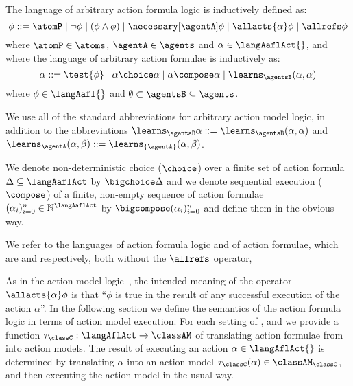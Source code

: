 \documentclass[twoside]{aiml14}
\begin{document}
  \begin{definition}
      The language \langAafl{} of arbitrary action formula logic is inductively defined as:
      $$
          \phi ::= \atomP \mid 
                 \neg \phi \mid
                 (\phi \land \phi) \mid
                 \necessary[\agentA] \phi \mid
                 \allacts{\alpha} \phi \mid
                 \allrefs \phi
      $$
      where $\atomP \in \atoms$, $\agentA \in \agents$ and 
      $\alpha \in \langAaflAct{}$, and where the language \langAaflAct{} of 
      arbitrary action formulae is inductively as:
      $$
          \alpha ::= \test{\phi} \mid
                 \alpha \choice \alpha \mid
                 \alpha \compose \alpha \mid
                 \learns_\agentsB (\alpha, \alpha)
      $$
      where $\phi \in \langAafl{}$ and $\emptyset \subset \agentsB \subseteq \agents$.
  \end{definition}

  We use all of the standard abbreviations for arbitrary action model logic, in
  addition to the abbreviations
  $\learns_\agentsB \alpha ::= \learns_\agentsB (\alpha, \alpha)$ and 
  $\learns_\agentA (\alpha, \beta) ::= \learns_{\{\agentA\}} (\alpha, \beta)$.

  We denote non-deterministic choice ($\choice$) over a finite set of action
  formula $\Delta \subseteq \langAaflAct$ by $\bigchoice \Delta$ 
  and we denote sequential execution ($\compose$) of a finite, non-empty
  sequence of action formulae $(\alpha_i)_{i=0}^{n} \in \mathbb{N}^\langAaflAct$ 
  by $\bigcompose (\alpha_i)_{i=0}^{n}$ and define them in the obvious way.

  We refer to the languages \langAfl{} of action formula logic and \langAflAct{} of action formulae, which are \langAafl{} and \langAaflAct{} respectively, both without the $\allrefs$ operator, 

  As in the action model logic~\cite{baltag2005}, the intended meaning of the
  operator $\allacts{\alpha} \phi$ is that ``$\phi$ is true in the result of
  any successful execution of the action $\alpha$''. In the following section
  we define the semantics of the action formula logic in terms of action model
  execution. For each setting of \classK{}, \classKFF{} and \classS{} we
  provide a function $\tau_\classC : \langAflAct \to \classAM$ of translating
  action formulae from \langAflAct{} into action models. The result of
  executing an action $\alpha \in \langAflAct{}$ is determined by translating
  $\alpha$ into an action model $\tau_\classC(\alpha) \in \classAM_\classC$, and then executing
  the action model in the usual way.
\end{document}
